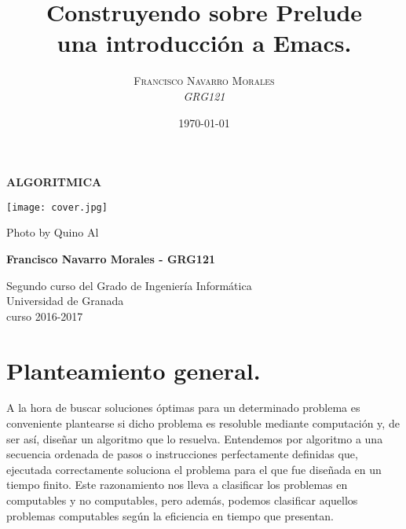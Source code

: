\documentclass[a4paper, 11pt]{article}
\title{\textbf{Construyendo sobre Prelude}\\ %
					una introducción a Emacs.} %
\author{\textsc{Francisco Navarro Morales} %
\\{\textit{GRG121}}} %
\date{\today} %
\makeatletter
\renewcommand{\maketitle}{
  \begin{flushright} %
  
  {\LARGE\@title} %
  
  \vspace{50pt} %
  
  {\large\@author} %
  \\\@date %
  \vspace{40pt} %
  \end{flushright}
}
\makeatother
\begin{document}
	
	
	\begin{titlepage}
		\begin{center}
			\vspace*{2cm}
			
			{\Huge \textbf{ALGORITMICA}}
			
			
			\vspace{0.5cm}
			
			
		    \texttt{[image: cover.jpg]}
		    
		    
		    {\footnotesize Photo by Quino Al}
			
			\vspace{2cm}
			
			\textbf{Francisco Navarro Morales - GRG121}
			
			\vfill
			
			Segundo curso del Grado de Ingeniería Informática\\
			Universidad de Granada\\
			curso 2016-2017\\
			
		\end{center}
	\end{titlepage}



\renewcommand{\abstractname}{Resumen} %



{\parskip=2pt
  \tableofcontents
}


\pagebreak
\section{Planteamiento general.}


A la hora de buscar soluciones óptimas para un determinado problema es conveniente plantearse si dicho problema es resoluble mediante computación y, de ser así, diseñar un algoritmo que lo resuelva. Entendemos por algoritmo a una secuencia ordenada de pasos o instrucciones perfectamente definidas que, ejecutada correctamente soluciona el problema para el que fue diseñada en un tiempo finito. Este razonamiento nos lleva a clasificar los problemas en computables y no computables, pero además, podemos clasificar aquellos problemas computables según la eficiencia en tiempo que presentan.
\end{document}
